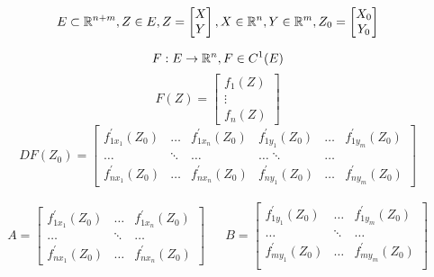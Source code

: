 \documentclass[main]{subfiles}
\begin{document}
      \begin{theorem}
         \[ E \subset {\vR}^{n+m}, Z \in E, Z = \begin{bmatrix*}
            X \\
            Y
         \end{bmatrix*},
         X \in {\vR}^n, Y \in {\vR}^m, Z_0 = \begin{bmatrix*}
            X_0 \\
            Y_0
         \end{bmatrix*} \]

         \[ F: E \rightarrow {\mathbb{R}}^n, F \in C^1(E) \] 
         \[F(Z) = \begin{bmatrix*}
            f_1(Z) \\
            \vdots \\
            f_n(Z)
         \end{bmatrix*}\] 
         \[ DF(Z_0) = \begin{bmatrix*}
            f^\prime_{1x_1}(Z_0) & \ldots & f^\prime_{1x_n}(Z_0) & f^\prime_{1y_1}(Z_0) & \ldots & f^\prime_{1y_m}(Z_0) \\
            \ldots & \ddots & \ldots & \ldots \ddots & \ldots \\
            f^\prime_{nx_1}(Z_0) & \ldots & f^\prime_{nx_n}(Z_0) & f^\prime_{ny_1}(Z_0) & \ldots & f^\prime_{ny_m}(Z_0) 
            
         \end{bmatrix*} \]

         \begin{align*}
            A = \begin{bmatrix*}
               f^\prime_{1x_1}(Z_0) & \ldots & f^\prime_{1x_n}(Z_0) \\
               \ldots & \ddots & \ldots \\
               f^\prime_{nx_1}(Z_0) & \ldots & f^\prime_{nx_n}(Z_0)
            \end{bmatrix*} && B =
            \begin{bmatrix*}
               f^\prime_{1y_1}(Z_0) & \ldots & f^\prime_{1y_m}(Z_0) \\
               \ldots & \ddots & \ldots \\
               f^\prime_{my_1}(Z_0) & \ldots & f^\prime_{my_m}(Z_0) \\
            \end{bmatrix*}
         \end{align*}


\end{theorem}
\end{document}
